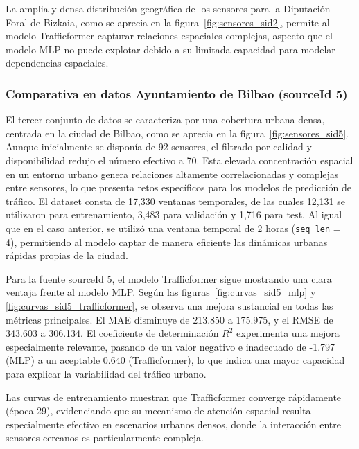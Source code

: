 La amplia y densa distribución geográfica de los sensores para la Diputación Foral de Bizkaia, como se aprecia en la figura~\ref{fig:sensores_sid2}, permite al modelo Trafficformer capturar relaciones espaciales complejas, aspecto que el modelo MLP no puede explotar debido a su limitada capacidad para modelar dependencias espaciales.

\subsubsection*{Comparativa en datos Ayuntamiento de Bilbao (sourceId 5)}

El tercer conjunto de datos se caracteriza por una cobertura urbana densa, centrada en la ciudad de Bilbao, como se aprecia en la figura~\ref{fig:sensores_sid5}. Aunque inicialmente se disponía de 92 sensores, el filtrado por calidad y disponibilidad redujo el número efectivo a 70. Esta elevada concentración espacial en un entorno urbano genera relaciones altamente correlacionadas y complejas entre sensores, lo que presenta retos específicos para los modelos de predicción de tráfico. El dataset consta de 17,330 ventanas temporales, de las cuales 12,131 se utilizaron para entrenamiento, 3,483 para validación y 1,716 para test. Al igual que en el caso anterior, se utilizó una ventana temporal de 2 horas (\texttt{seq\_len} = 4), permitiendo al modelo captar de manera eficiente las dinámicas urbanas rápidas propias de la ciudad.

Para la fuente sourceId 5, el modelo Trafficformer sigue mostrando una clara ventaja frente al modelo MLP. Según las figuras~\ref{fig:curvas_sid5_mlp} y \ref{fig:curvas_sid5_trafficformer}, se observa una mejora sustancial en todas las métricas principales. El MAE disminuye de 213.850 a 175.975, y el RMSE de 343.603 a 306.134. El coeficiente de determinación $R^2$ experimenta una mejora especialmente relevante, pasando de un valor negativo e inadecuado de -1.797 (MLP) a un aceptable 0.640 (Trafficformer), lo que indica una mayor capacidad para explicar la variabilidad del tráfico urbano.

Las curvas de entrenamiento muestran que Trafficformer converge rápidamente (época 29), evidenciando que su mecanismo de atención espacial resulta especialmente efectivo en escenarios urbanos densos, donde la interacción entre sensores cercanos es particularmente compleja.

